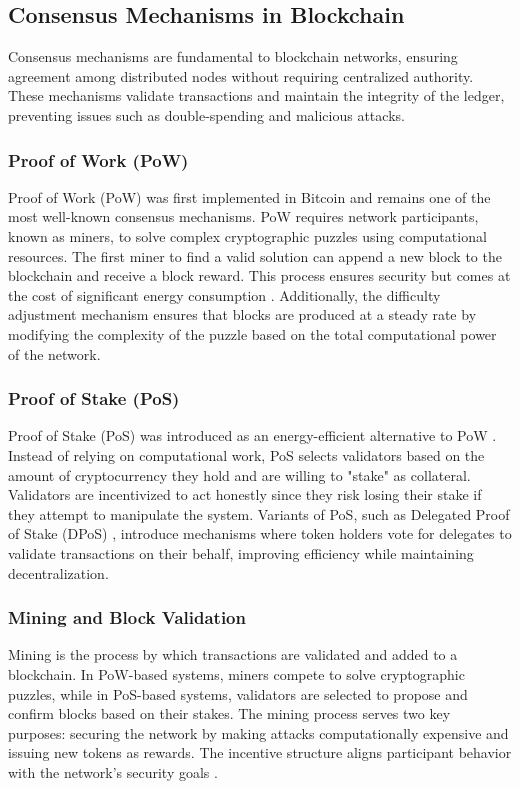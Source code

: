 \documentclass{article}
\begin{document}
\subsection{Consensus Mechanisms in Blockchain}

Consensus mechanisms are fundamental to blockchain networks, ensuring agreement among distributed nodes without requiring centralized authority. These mechanisms validate transactions and maintain the integrity of the ledger, preventing issues such as double-spending and malicious attacks.

\subsubsection{Proof of Work (PoW)}
Proof of Work (PoW) was first implemented in Bitcoin \cite{nakamoto2008bitcoin} and remains one of the most well-known consensus mechanisms. PoW requires network participants, known as miners, to solve complex cryptographic puzzles using computational resources. The first miner to find a valid solution can append a new block to the blockchain and receive a block reward. This process ensures security but comes at the cost of significant energy consumption \cite{narayanan2016bitcoin}. Additionally, the difficulty adjustment mechanism ensures that blocks are produced at a steady rate by modifying the complexity of the puzzle based on the total computational power of the network.

\subsubsection{Proof of Stake (PoS)}
Proof of Stake (PoS) was introduced as an energy-efficient alternative to PoW \cite{king2012ppcoin}. Instead of relying on computational work, PoS selects validators based on the amount of cryptocurrency they hold and are willing to "stake" as collateral. Validators are incentivized to act honestly since they risk losing their stake if they attempt to manipulate the system. Variants of PoS, such as Delegated Proof of Stake (DPoS) \cite{larimer2014delegated}, introduce mechanisms where token holders vote for delegates to validate transactions on their behalf, improving efficiency while maintaining decentralization.

\subsubsection{Mining and Block Validation}
Mining is the process by which transactions are validated and added to a blockchain. In PoW-based systems, miners compete to solve cryptographic puzzles, while in PoS-based systems, validators are selected to propose and confirm blocks based on their stakes. The mining process serves two key purposes: securing the network by making attacks computationally expensive and issuing new tokens as rewards. The incentive structure aligns participant behavior with the network’s security goals \cite{bonneau2015sok}.
\end{document}
